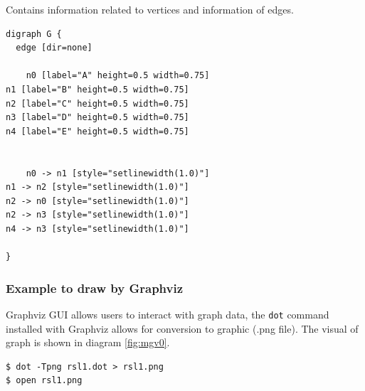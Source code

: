 Contains information related to vertices and information of edges. 

\begin{Verbatim}[baselinestretch=0.7,frame=single]
digraph G { 
  edge [dir=none]

    n0 [label="A" height=0.5 width=0.75] 
n1 [label="B" height=0.5 width=0.75] 
n2 [label="C" height=0.5 width=0.75] 
n3 [label="D" height=0.5 width=0.75] 
n4 [label="E" height=0.5 width=0.75] 


    n0 -> n1 [style="setlinewidth(1.0)"]
n1 -> n2 [style="setlinewidth(1.0)"]
n2 -> n0 [style="setlinewidth(1.0)"]
n2 -> n3 [style="setlinewidth(1.0)"]
n4 -> n3 [style="setlinewidth(1.0)"]

}
\end{Verbatim}

\subsubsection*{Example to draw by Graphviz}

Graphviz GUI allows users to interact with graph data, the \verb|dot| command installed with Graphviz allows for conversion to graphic (.png file). The visual of graph is shown in diagram \ref{fig:mgv0}. 


\begin{Verbatim}[baselinestretch=0.7,frame=single]
$ dot -Tpng rsl1.dot > rsl1.png
$ open rsl1.png
\end{Verbatim}

